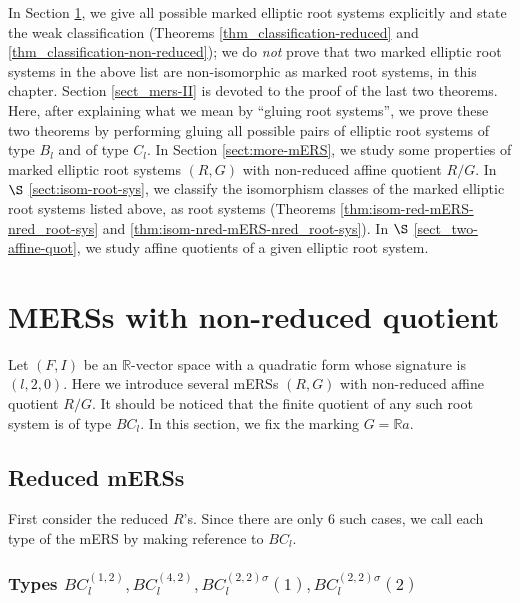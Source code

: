 \documentclass[11pt]{amsart}
\newcommand{\R}{\mathbb{R}}
\begin{document}
In Section \ref{sect:MERS-non-red-quot}, we give all possible marked elliptic root systems explicitly and state the weak classification (Theorems \ref{thm_classification-reduced} and \ref{thm_classification-non-reduced}); we do \textit{not} prove that two marked elliptic root systems in the above list are non-isomorphic as marked root systems, in this chapter.  Section \ref{sect_mers-II} is devoted to the proof of the last two theorems. Here, after explaining what we mean by ``gluing root systems'', we prove these two theorems by performing gluing all possible pairs of elliptic root systems of type $B_l$ and of type $C_l$. In Section \ref{sect:more-mERS}, we 
study some properties of marked elliptic root systems $(R,G)$ with non-reduced affine quotient $R/G$. In $\S$ \ref{sect:isom-root-sys}, we classify the isomorphism classes of the marked elliptic root systems listed above, as root systems (Theorems \ref{thm:isom-red-mERS-nred_root-sys} and \ref{thm:isom-nred-mERS-nred_root-sys}). In $\S$ \ref{sect_two-affine-quot}, we study affine quotients of a given elliptic root system. 


\section{MERSs with non-reduced quotient}\label{sect:MERS-non-red-quot}
Let $(F,I)$ be an $\R$-vector space with a quadratic form whose signature is $(l,2,0)$.
Here we introduce several mERSs $(R,G)$ with non-reduced affine quotient $R/G$. It should be noticed that the finite quotient of any such root system is of type $BC_l$. In this section, we fix the marking $G=\R a$. 
\subsection{Reduced mERSs}\label{sect:intro_red-non-red-quot}
First consider the reduced $R$'s. Since there are only 6 such cases, we call each type of the mERS by making reference to $BC_l$. 
\subsubsection{Types $BC_l^{(1,2)}, BC_l^{(4,2)}, BC_l^{(2,2)\sigma}(1), BC_l^{(2,2)\sigma}(2)$}
\label{sect:intro_red-classic}
\end{document}
